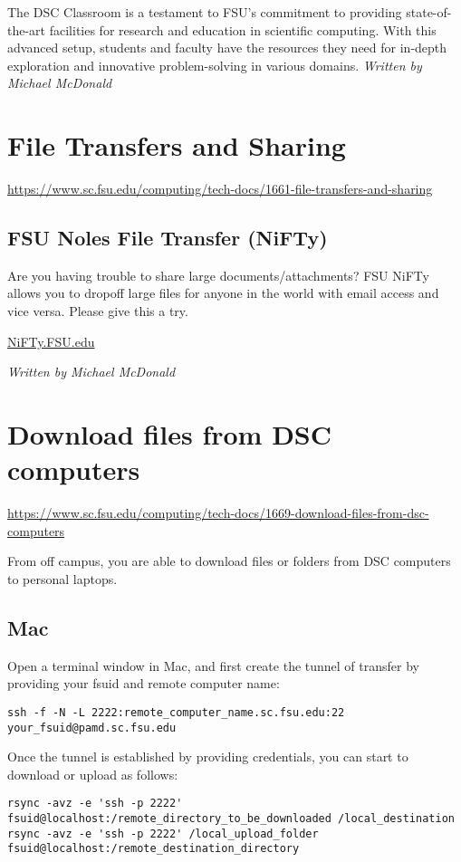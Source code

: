 \documentclass[12pt,a4paper]{article}
\begin{document}
The DSC Classroom is a testament to FSU's commitment to providing state-of-the-art facilities for research and education in scientific computing. With this advanced setup, students and faculty have the resources they need for in-depth exploration and innovative problem-solving in various domains.
\hfill \textit{Written by Michael McDonald}

\section{File Transfers and Sharing}
\url{https://www.sc.fsu.edu/computing/tech-docs/1661-file-transfers-and-sharing}

\subsection*{FSU Noles File Transfer (NiFTy)}
Are you having trouble to share large documents/attachments? FSU NiFTy allows you to dropoff large files for anyone in the world with email access and vice versa. Please give this a try.
\begin{center}
    \href{http://NiFTy.FSU.edu}{NiFTy.FSU.edu}
\end{center}
\hfill \textit{Written by Michael McDonald}

\section{Download files from DSC computers}
\url{https://www.sc.fsu.edu/computing/tech-docs/1669-download-files-from-dsc-computers}

From off campus, you are able to download files or folders from DSC computers to personal laptops.

\subsection*{Mac}
Open a terminal window in Mac, and first create the tunnel of transfer by providing your fsuid and remote computer name:
\begin{verbatim}
ssh -f -N -L 2222:remote_computer_name.sc.fsu.edu:22 your_fsuid@pamd.sc.fsu.edu
\end{verbatim}
Once the tunnel is established by providing credentials, you can start to download or upload as follows:
\begin{verbatim}
rsync -avz -e 'ssh -p 2222' fsuid@localhost:/remote_directory_to_be_downloaded /local_destination
rsync -avz -e 'ssh -p 2222' /local_upload_folder fsuid@localhost:/remote_destination_directory
\end{verbatim}
\end{document}
